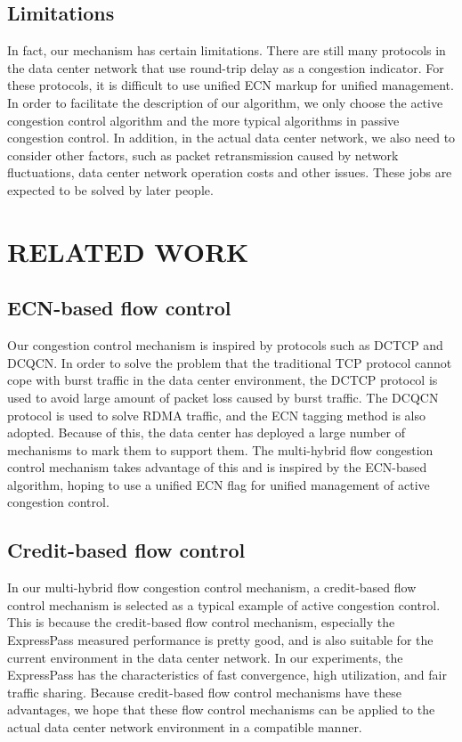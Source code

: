 \documentclass[conference]{IEEEtran}
\begin{document}
\subsection{Limitations}In fact, our mechanism has certain limitations. There are still many protocols in the data center network that use round-trip delay as a congestion indicator. For these protocols, it is difficult to use unified ECN markup for unified management. In order to facilitate the description of our algorithm, we only choose the active congestion control algorithm and the more typical algorithms in passive congestion control. In addition, in the actual data center network, we also need to consider other factors, such as packet retransmission caused by network fluctuations, data center network operation costs and other issues. These jobs are expected to be solved by later people.
\section{RELATED WORK}
\subsection{ECN-based flow control}Our congestion control mechanism is inspired by protocols such as DCTCP and DCQCN. In order to solve the problem that the traditional TCP protocol cannot cope with burst traffic in the data center environment, the DCTCP protocol is used to avoid large amount of packet loss caused by burst traffic. The DCQCN protocol is used to solve RDMA traffic, and the ECN tagging method is also adopted. Because of this, the data center has deployed a large number of mechanisms to mark them to support them. The multi-hybrid flow congestion control mechanism takes advantage of this and is inspired by the ECN-based algorithm, hoping to use a unified ECN flag for unified management of active congestion control.
\subsection{Credit-based flow control}In our multi-hybrid flow congestion control mechanism, a credit-based flow control mechanism is selected as a typical example of active congestion control. This is because the credit-based flow control mechanism, especially the ExpressPass measured performance is pretty good, and is also suitable for the current environment in the data center network. In our experiments, the ExpressPass has the characteristics of fast convergence, high utilization, and fair traffic sharing. Because credit-based flow control mechanisms have these advantages, we hope that these flow control mechanisms can be applied to the actual data center network environment in a compatible manner.
\end{document}
